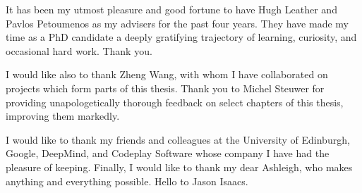 It has been my utmost pleasure and good fortune to have Hugh Leather and Pavlos Petoumenos as my advisers for the past four years. They have made my time as a PhD candidate a deeply gratifying trajectory of learning, curiosity, and occasional hard work. Thank you.

I would like also to thank Zheng Wang, with whom I have collaborated on projects which form parts of this thesis. Thank you to Michel Steuwer for providing unapologetically thorough feedback on select chapters of this thesis, improving them markedly.

I would like to thank my friends and colleagues at the University of Edinburgh, Google, DeepMind, and Codeplay Software whose company I have had the pleasure of keeping. Finally, I would like to thank my dear Ashleigh, who makes anything and everything possible. Hello to Jason Isaacs.